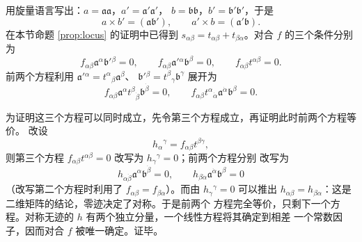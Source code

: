 用旋量语言写出：$a=\mathfrak a\mathfrak a$，$a'=\mathfrak a'\mathfrak a'$，
$b=\mathfrak b\mathfrak b$，$b'=\mathfrak b'\mathfrak b'$，于是
\[
a\times b'=(\mathfrak a\mathfrak b'),\qquad a'\times b=(\mathfrak a'\mathfrak b).
\]
在本节命题 \ref{prop:locus} 的证明中已得到
$s_{\alpha\beta}=t_{\alpha\beta}+t_{\beta\alpha}$。对合 $f$ 的三个条件分别为
\begin{equation}\label{eq:pascaleq}
f_{\alpha\beta}\mathfrak a^\alpha\mathfrak b'{}^\beta=0,\qquad
f_{\alpha\beta}\mathfrak a'{}^\alpha\mathfrak b^\beta=0,\qquad
f_{\alpha\beta}t^{\alpha\beta}=0 .
\end{equation}
前两个方程利用 $\mathfrak a'{}^\alpha=t^\alpha{}_\beta\mathfrak a^\beta$、
$\mathfrak b'{}^\beta=t^\beta{}_\gamma\mathfrak b^\gamma$ 展开为
\[
f_{\alpha\beta}\mathfrak a^\alpha t^\beta{}_{\dot\beta}\mathfrak b^{\dot\beta}=0,
\qquad
f_{\alpha\beta}t^\alpha{}_{\dot\alpha}\mathfrak a^{\dot\alpha}\mathfrak b^\beta=0 .
\]

为证明这三个方程可以同时成立，先令第三个方程成立，再证明此时前两个方程等价。
改设
\[
h_\alpha{}^\gamma=f_{\alpha\beta}t^{\beta\gamma},
\]
则第三个方程 $f_{\alpha\beta}t^{\alpha\beta}=0$ 改写为 $h_\gamma{}^\gamma=0$；前两个方程分别
改写为
\[
h_{\alpha\dot\beta}\mathfrak a^\alpha\mathfrak b^{\dot\beta}=0,
\qquad
h_{\beta\dot\alpha}\mathfrak a^{\dot\alpha}\mathfrak b^\beta=0
\]
（改写第二个方程时利用了 $f_{\alpha\beta}=f_{\beta\alpha}$）。而由 $h_\gamma{}^\gamma=0$
可以推出 $h_{\alpha\beta}=h_{\beta\alpha}$：这是二维矩阵的结论，零迹决定了对称。于是前两个
方程完全等价，只剩下一个方程。对称无迹的 $h$ 有两个独立分量，一个线性方程将其确定到相差
一个常数因子，因而对合 $f$ 被唯一确定。证毕。
